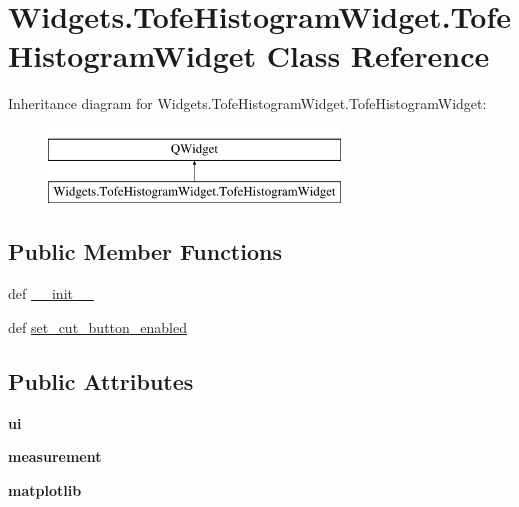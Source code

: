 \hypertarget{classWidgets_1_1TofeHistogramWidget_1_1TofeHistogramWidget}{\section{Widgets.\-Tofe\-Histogram\-Widget.\-Tofe\-Histogram\-Widget Class Reference}
\label{classWidgets_1_1TofeHistogramWidget_1_1TofeHistogramWidget}
}
Inheritance diagram for Widgets.\-Tofe\-Histogram\-Widget.\-Tofe\-Histogram\-Widget\-:\begin{figure}[H]
\begin{center}
\leavevmode
\includegraphics[height=2.000000cm]{classWidgets_1_1TofeHistogramWidget_1_1TofeHistogramWidget}
\end{center}
\end{figure}
\subsection*{Public Member Functions}
\begin{DoxyCompactItemize}
\item 
def \hyperlink{classWidgets_1_1TofeHistogramWidget_1_1TofeHistogramWidget_ae62599e21addfb4b00ef6307d20a404e}{\-\_\-\-\_\-init\-\_\-\-\_\-}
\item 
def \hyperlink{classWidgets_1_1TofeHistogramWidget_1_1TofeHistogramWidget_acd6f871c8e017a45c9711663c42db92f}{set\-\_\-cut\-\_\-button\-\_\-enabled}
\end{DoxyCompactItemize}
\subsection*{Public Attributes}
\begin{DoxyCompactItemize}
\item 
\hypertarget{classWidgets_1_1TofeHistogramWidget_1_1TofeHistogramWidget_ac79de3569efc186c342fb3bb9dea4029}{{\bfseries ui}}\label{classWidgets_1_1TofeHistogramWidget_1_1TofeHistogramWidget_ac79de3569efc186c342fb3bb9dea4029}

\item 
\hypertarget{classWidgets_1_1TofeHistogramWidget_1_1TofeHistogramWidget_a4ad66273da0a78469aad735f9af33b86}{{\bfseries measurement}}\label{classWidgets_1_1TofeHistogramWidget_1_1TofeHistogramWidget_a4ad66273da0a78469aad735f9af33b86}

\item 
\hypertarget{classWidgets_1_1TofeHistogramWidget_1_1TofeHistogramWidget_a3f01eba165e5e48e53cfdebde1396a68}{{\bfseries matplotlib}}\label{classWidgets_1_1TofeHistogramWidget_1_1TofeHistogramWidget_a3f01eba165e5e48e53cfdebde1396a68}

\end{DoxyCompactItemize}


